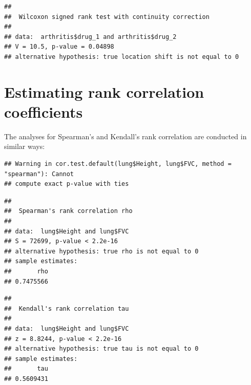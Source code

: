 \documentclass[
]{memoir}
\newenvironment{Shaded}{\begin{snugshade}}{\end{snugshade}}
\newcommand{\AttributeTok}[1]{\textcolor[rgb]{0.77,0.63,0.00}{#1}}
\newcommand{\FunctionTok}[1]{\textcolor[rgb]{0.00,0.00,0.00}{#1}}
\newcommand{\NormalTok}[1]{#1}
\newcommand{\OtherTok}[1]{\textcolor[rgb]{0.56,0.35,0.01}{#1}}
\newcommand{\SpecialCharTok}[1]{\textcolor[rgb]{0.00,0.00,0.00}{#1}}
\newcommand{\StringTok}[1]{\textcolor[rgb]{0.31,0.60,0.02}{#1}}
\begin{document}
\begin{verbatim}
## 
##  Wilcoxon signed rank test with continuity correction
## 
## data:  arthritis$drug_1 and arthritis$drug_2
## V = 10.5, p-value = 0.04898
## alternative hypothesis: true location shift is not equal to 0
\end{verbatim}

\hypertarget{estimating-rank-correlation-coefficients}{%
\section{Estimating rank correlation coefficients}\label{estimating-rank-correlation-coefficients}}

The analyses for Spearman's and Kendall's rank correlation are conducted in similar ways:

\begin{Shaded}
\end{Shaded}

\begin{verbatim}
## Warning in cor.test.default(lung$Height, lung$FVC, method = "spearman"): Cannot
## compute exact p-value with ties
\end{verbatim}

\begin{verbatim}
## 
##  Spearman's rank correlation rho
## 
## data:  lung$Height and lung$FVC
## S = 72699, p-value < 2.2e-16
## alternative hypothesis: true rho is not equal to 0
## sample estimates:
##       rho 
## 0.7475566
\end{verbatim}

\begin{Shaded}
\end{Shaded}

\begin{verbatim}
## 
##  Kendall's rank correlation tau
## 
## data:  lung$Height and lung$FVC
## z = 8.8244, p-value < 2.2e-16
## alternative hypothesis: true tau is not equal to 0
## sample estimates:
##       tau 
## 0.5609431
\end{verbatim}

  
\end{document}
